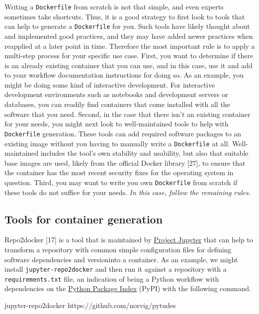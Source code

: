 \documentclass[10pt,letterpaper]{article}
\newenvironment{Shaded}{\begin{snugshade}}{\end{snugshade}}
\newcommand{\ExtensionTok}[1]{#1}
\newcommand{\NormalTok}[1]{#1}
\begin{document}
Writing a \texttt{Dockerfile} from scratch is not that simple, and even
experts sometimes take shortcuts. Thus, it is a good strategy to first
look to tools that can help to generate a \texttt{Dockerfile} for you.
Such tools have likely thought about and implemented good practices, and
they may have added newer practices when reapplied at a later point in
time. Therefore the most important rule is to apply a multi-step process
for your specific use case. First, you want to determine if there is an
already existing container that you can use, and in this case, use it
and add to your workflow documentation instructions for doing so. As an
example, you might be doing some kind of interactive development. For
interactive development environments such as notebooks and development
servers or databases, you can readily find containers that come
installed with all the software that you need. Second, in the case that
there isn't an existing container for your needs, you might next look to
well-maintained tools to help with \texttt{Dockerfile} generation. These
tools can add required software packages to an existing image without
you having to manually write a \texttt{Dockerfile} at all.
Well-maintained includes the tool's own stability and usability, but
also that suitable base images are used, likely from the official Docker
library {[}27{]}, to ensure that the container has the most recent
security fixes for the operating system in question. Third, you may want
to write you own \texttt{Dockerfile} from scratch if these tools do not
suffice for your needs. \emph{In this case, follow the remaining rules.}

\hypertarget{tools-for-container-generation}{%
\subsection{Tools for container
generation}\label{tools-for-container-generation}}

Repo2docker {[}17{]} is a tool that is maintained by
\href{https://jupyter.org/}{Project Jupyter} that can help to transform
a repository with common simple configuration files for defining
software dependencies and versioninto a container. As an example, we
might install \texttt{jupyter-repo2docker} and then run it against a
repository with a \texttt{requirements.txt} file, an indication of being
a Python workflow with dependencies on the
\href{https://pypi.org/}{Python Package Index} (PyPI) with the following
command.

\begin{Shaded}
\begin{Highlighting}[]
\ExtensionTok{jupyter-repo2docker}\NormalTok{ https://github.com/norvig/pytudes}
\end{Highlighting}
\end{Shaded}
\end{document}
